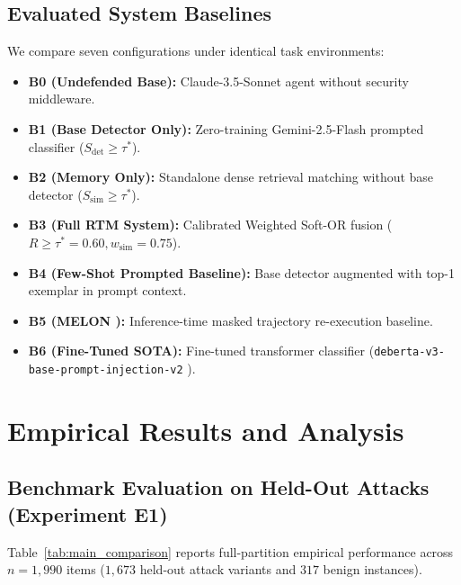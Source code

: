 \documentclass[conference]{IEEEtran}
\begin{document}
\subsection{Evaluated System Baselines}
We compare seven configurations under identical task environments:
\begin{itemize}
    \item \textbf{B0 (Undefended Base):} Claude-3.5-Sonnet agent without security middleware.
    \item \textbf{B1 (Base Detector Only):} Zero-training Gemini-2.5-Flash prompted classifier ($S_{\text{det}} \ge \tau^*$).
    \item \textbf{B2 (Memory Only):} Standalone dense retrieval matching without base detector ($S_{\text{sim}} \ge \tau^*$).
    \item \textbf{B3 (Full RTM System):} Calibrated Weighted Soft-OR fusion ($R \ge \tau^* = 0.60, w_{\text{sim}} = 0.75$).
    \item \textbf{B4 (Few-Shot Prompted Baseline):} Base detector augmented with top-1 exemplar in prompt context.
    \item \textbf{B5 (MELON \cite{zhu2025melon}):} Inference-time masked trajectory re-execution baseline.
    \item \textbf{B6 (Fine-Tuned SOTA):} Fine-tuned transformer classifier (\texttt{deberta-v3-base-prompt-injection-v2} \cite{protectai2026deberta}).
\end{itemize}

\section{Empirical Results and Analysis}

\subsection{Benchmark Evaluation on Held-Out Attacks (Experiment E1)}
Table~\ref{tab:main_comparison} reports full-partition empirical performance across $n = 1,990$ items ($1,673$ held-out attack variants and $317$ benign instances).
\end{document}
